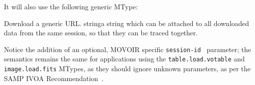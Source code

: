 		It will also use the following generic MType:
		
				{Download a generic URL.}
				{
				{string}{a string which can be attached to all
				downloaded data from the same session, so that they
				can be traced together.}
				}
				{\mtypeparamnone}
				
		Notice the addition of an optional, MOVOIR specific
		\texttt{session-id } parameter; the semantics remains the
		same for applications using the \texttt{table.load.votable}
		and \texttt{image.load.fits} MTypes, as they should ignore
		unknown parameters, as per the SAMP IVOA
		Recommendation~\cite{2009samp.ivoav0904T}.
	
	
	

